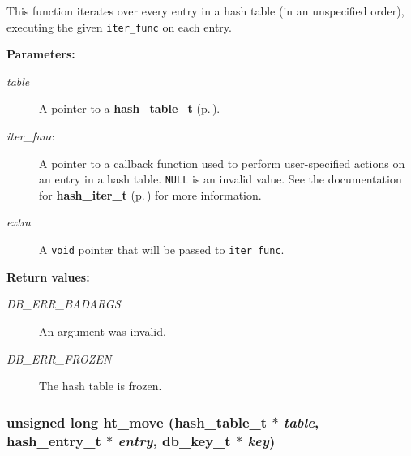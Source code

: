  This function iterates over every entry in a hash table (in an unspecified order), executing the given {\tt iter\_\-func} on each entry.\begin{Desc}
\item[{\bf Parameters: }]\par
\begin{description}
\item[
{\em table}]A pointer to a {\bf hash\_\-table\_\-t} {\rm (p.\,\pageref{group__dbprim__hash_a0})}. \item[
{\em iter\_\-func}]A pointer to a callback function used to perform user-specified actions on an entry in a hash table. {\tt NULL} is an invalid value. See the documentation for {\bf hash\_\-iter\_\-t} {\rm (p.\,\pageref{group__dbprim__hash_a2})} for more information. \item[
{\em extra}]A {\tt void} pointer that will be passed to {\tt iter\_\-func}.\end{description}
\end{Desc}
\begin{Desc}
\item[{\bf Return values: }]\par
\begin{description}
\item[
{\em DB\_\-ERR\_\-BADARGS}]An argument was invalid. \item[
{\em DB\_\-ERR\_\-FROZEN}]The hash table is frozen. \end{description}
\end{Desc}
\subsubsection{\setlength{\rightskip}{0pt plus 5cm}unsigned long ht\_\-move ({\bf hash\_\-table\_\-t} $\ast$ {\em table}, {\bf hash\_\-entry\_\-t} $\ast$ {\em entry}, {\bf db\_\-key\_\-t} $\ast$ {\em key})}\label{group__dbprim__hash_a8}




